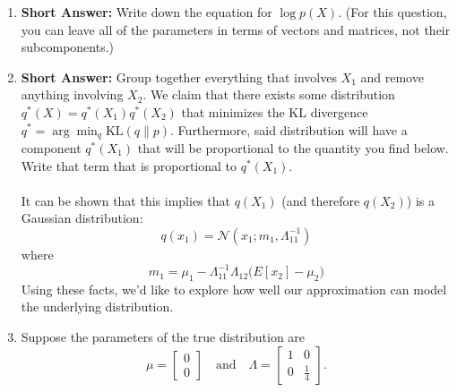 \documentclass[a3paper,12pt]{extarticle} %
\begin{document}
\begin{enumerate}
    \item \textbf{Short Answer:} Write down the equation for \( \log p(X) \). (For this question, you can leave all of the parameters in terms of vectors and matrices, not their subcomponents.)
    \item \textbf{Short Answer:} Group together everything that involves \( X_1 \) and remove anything involving \( X_2 \). We claim that there exists some distribution \( q^*(X) = q^*(X_1)q^*(X_2) \) that minimizes the KL divergence \( q^* = \arg\min_q \text{KL}(q \| p) \). Furthermore, said distribution will have a component \( q^*(X_1) \) that will be proportional to the quantity you find below. Write that term that is proportional to \( q^*(X_1) \).
    \\\\ It can be shown that this implies that \( q(X_1) \) (and therefore \( q(X_2) \)) is a Gaussian distribution:
    \[
    q(x_1) = \mathcal{N} \left( x_1; m_1, \Lambda_{11}^{-1} \right)
    \]
    where 
    \[
    m_1 = \mu_1 - \Lambda_{11}^{-1} \Lambda_{12} \big(E[x_2] - \mu_2\big)
    \]
    Using these facts, we’d like to explore how well our approximation can model the underlying distribution.
    \item Suppose the parameters of the true distribution are 
    \[
    \mu = 
    \begin{bmatrix}
    0 \\
    0
    \end{bmatrix}
    \quad \text{and} \quad
    \Lambda = 
    \begin{bmatrix}
    1 & 0 \\
    0 & \frac{1}{4}
    \end{bmatrix}.
    \]
    

\end{enumerate}
\end{document}
